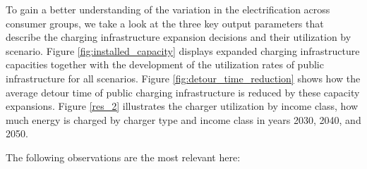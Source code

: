 \documentclass[preprint,review,11pt, authoryear]{elsarticle}
\begin{document}
        To gain a better understanding of the variation in the electrification across consumer groups, we take a look at the three key output parameters that describe the charging infrastructure expansion decisions and their utilization by scenario. Figure \ref{fig:installed_capacity} displays expanded charging infrastructure capacities together with the development of the utilization rates of public infrastructure for all scenarios. 
        Figure \ref{fig:detour_time_reduction} shows how the average detour time of public charging infrastructure is reduced by these capacity expansions. Figure \ref{res_2} illustrates the charger utilization by income class,  how much energy is charged by charger type and income class in years 2030, 2040, and 2050.
        
        The following observations are the most relevant here:
\end{document}
